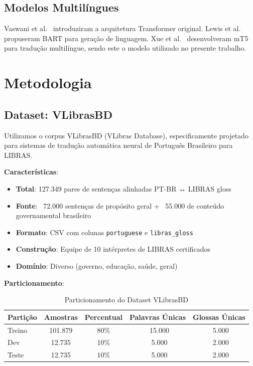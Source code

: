 \documentclass[12pt]{article}
\begin{document}
\subsection{Modelos Multilíngues}

Vaswani et al.~\cite{vaswani2017} introduziram a arquitetura Transformer original. Lewis et al.~\cite{lewis2020} propuseram BART para geração de linguagem. Xue et al.~\cite{xue2021} desenvolveram mT5 para tradução multilíngue, sendo este o modelo utilizado no presente trabalho.

\section{Metodologia}

\subsection{Dataset: VLibrasBD}

Utilizamos o corpus VLibrasBD (VLibras Database), especificamente projetado para sistemas de tradução automática neural de Português Brasileiro para LIBRAS.

\textbf{Características}:
\begin{itemize}
\item \textbf{Total}: 127.349 pares de sentenças alinhadas PT-BR ↔ LIBRAS gloss
\item \textbf{Fonte}: ~72.000 sentenças de propósito geral + ~55.000 de conteúdo governamental brasileiro
\item \textbf{Formato}: CSV com colunas \texttt{portuguese} e \texttt{libras\_gloss}
\item \textbf{Construção}: Equipe de 10 intérpretes de LIBRAS certificados
\item \textbf{Domínio}: Diverso (governo, educação, saúde, geral)
\end{itemize}

\textbf{Particionamento}:
\begin{table}[ht]
\centering
\caption{Particionamento do Dataset VLibrasBD}
\label{tab:dataset}
\begin{tabular}{lcccc}
\toprule
Partição & Amostras & Percentual & Palavras Únicas & Glossas Únicas \\
\midrule
Treino   & 101.879  & 80\%        & ~15.000         & ~5.000         \\
Dev      & 12.735   & 10\%        & ~5.000          & ~2.000         \\
Teste    & 12.735   & 10\%        & ~5.000          & ~2.000         \\
\bottomrule
\end{tabular}
\end{table}
\end{document}
